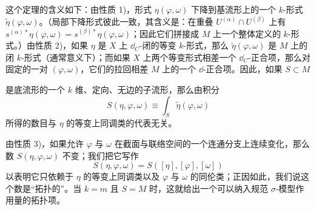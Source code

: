 
这个定理的含义如下：由性质 1)，形式 $\eta(\varphi,\omega)$ 下降到基流形上的一个 $k$-形式 $\tilde{\eta}(\varphi,\omega)$。（局部下降形式彼此一致，其含义是：在重叠 $U^{(\alpha)}\cap U^{(\beta)}$ 上有 $s^{(\alpha)*}\eta(\varphi,\omega) = s^{(\beta)*}\eta(\varphi,\omega)$；因此它们拼接成 $M$ 上一个整体定义的 $k$-形式。）由性质 2)，如果 $\eta$ 是 $X$ 上 $\dd_C$-闭的等变 $k$-形式，那么 $\tilde{\eta}(\varphi,\omega)$ 是 $M$ 上的闭 $k$-形式（通常意义下）；而如果 $X$ 上两个等变形式相差一个 $\dd_C$-正合项，那么对固定的一对 $(\varphi,\omega)$，它们的拉回相差 $M$ 上的一个 $\dd$-正合项。因此，如果 $S\subset M$


是底流形的一个 $k$ 维、定向、无边的子流形，那么由积分
\[ S(\eta,\varphi,\omega) \equiv \int_S \tilde{\eta}(\varphi,\omega) \]
所得的数目与 $\eta$ 的等变上同调类的代表无关。


由性质 3)，如果允许 $\varphi$ 与 $\omega$ 在截面与联络空间的一个连通分支上连续变化，那么数 $S(\eta,\varphi,\omega)$ 不变；我们把它写作
\[ S(\eta,\varphi,\omega) = S([\eta],[\varphi],[\omega]) \]
以表明它只依赖于 $\eta$ 的等变上同调类以及 $\varphi$ 与 $\omega$ 的同伦类；正因如此，我们说这个数是“拓扑的”。当 $k=m$ 且 $S=M$ 时，这就给出一个可以纳入规范 $\sigma$-模型作用量的拓扑项。
